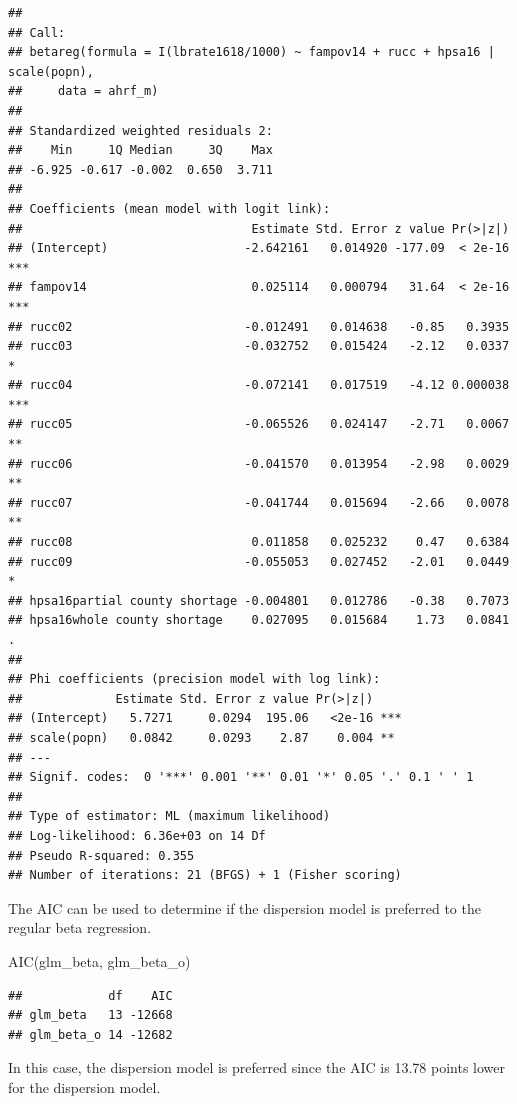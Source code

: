\documentclass[
]{article}
\newenvironment{Shaded}{\begin{snugshade}}{\end{snugshade}}
\newcommand{\FunctionTok}[1]{\textcolor[rgb]{0.00,0.00,0.00}{#1}}
\newcommand{\NormalTok}[1]{#1}
\begin{document}
\begin{verbatim}
## 
## Call:
## betareg(formula = I(lbrate1618/1000) ~ fampov14 + rucc + hpsa16 | scale(popn), 
##     data = ahrf_m)
## 
## Standardized weighted residuals 2:
##    Min     1Q Median     3Q    Max 
## -6.925 -0.617 -0.002  0.650  3.711 
## 
## Coefficients (mean model with logit link):
##                                Estimate Std. Error z value Pr(>|z|)    
## (Intercept)                   -2.642161   0.014920 -177.09  < 2e-16 ***
## fampov14                       0.025114   0.000794   31.64  < 2e-16 ***
## rucc02                        -0.012491   0.014638   -0.85   0.3935    
## rucc03                        -0.032752   0.015424   -2.12   0.0337 *  
## rucc04                        -0.072141   0.017519   -4.12 0.000038 ***
## rucc05                        -0.065526   0.024147   -2.71   0.0067 ** 
## rucc06                        -0.041570   0.013954   -2.98   0.0029 ** 
## rucc07                        -0.041744   0.015694   -2.66   0.0078 ** 
## rucc08                         0.011858   0.025232    0.47   0.6384    
## rucc09                        -0.055053   0.027452   -2.01   0.0449 *  
## hpsa16partial county shortage -0.004801   0.012786   -0.38   0.7073    
## hpsa16whole county shortage    0.027095   0.015684    1.73   0.0841 .  
## 
## Phi coefficients (precision model with log link):
##             Estimate Std. Error z value Pr(>|z|)    
## (Intercept)   5.7271     0.0294  195.06   <2e-16 ***
## scale(popn)   0.0842     0.0293    2.87    0.004 ** 
## ---
## Signif. codes:  0 '***' 0.001 '**' 0.01 '*' 0.05 '.' 0.1 ' ' 1 
## 
## Type of estimator: ML (maximum likelihood)
## Log-likelihood: 6.36e+03 on 14 Df
## Pseudo R-squared: 0.355
## Number of iterations: 21 (BFGS) + 1 (Fisher scoring)
\end{verbatim}

The AIC can be used to determine if the dispersion model is preferred to the regular beta regression.

\begin{Shaded}
\begin{Highlighting}[]
\FunctionTok{AIC}\NormalTok{(glm\_beta, glm\_beta\_o)}
\end{Highlighting}
\end{Shaded}

\begin{verbatim}
##            df    AIC
## glm_beta   13 -12668
## glm_beta_o 14 -12682
\end{verbatim}

In this case, the dispersion model is preferred since the AIC is 13.78 points lower for the dispersion model.
\end{document}
